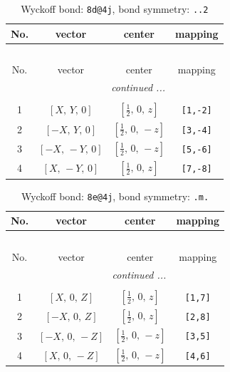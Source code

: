 \documentclass[fleqn,8pt]{jsarticle}
\begin{document}
\begin{longtable}{cccc}
\caption{Wyckoff bond: {\tt 8d@4j}, bond symmetry: {\tt ..2}}
 \\
 \hline \hline
No. & vector & center & mapping \\ \hline \endfirsthead

\multicolumn{3}{l}{\tablename\ \thetable{}} \\
 \hline \hline
No. & vector & center & mapping \\ \hline \endhead

 \hline \hline
\multicolumn{3}{r}{\footnotesize\it continued ...} \\ \endfoot

 \hline \hline
\multicolumn{3}{r}{} \\ \endlastfoot

1 & $\left[ X,\, Y,\, 0 \right]$ & $\left[ \frac{1}{2},\, 0,\, z \right]$ & {\tt [1,-2]} \\ \hline
2 & $\left[ - X,\, Y,\, 0 \right]$ & $\left[ \frac{1}{2},\, 0,\, - z \right]$ & {\tt [3,-4]} \\ \hline
3 & $\left[ - X,\, - Y,\, 0 \right]$ & $\left[ \frac{1}{2},\, 0,\, - z \right]$ & {\tt [5,-6]} \\ \hline
4 & $\left[ X,\, - Y,\, 0 \right]$ & $\left[ \frac{1}{2},\, 0,\, z \right]$ & {\tt [7,-8]} \\
\end{longtable}
\renewcommand{\arraystretch}{1.2}
\begin{longtable}{cccc}
\caption{Wyckoff bond: {\tt 8e@4j}, bond symmetry: {\tt .m.}}
 \\
 \hline \hline
No. & vector & center & mapping \\ \hline \endfirsthead

\multicolumn{3}{l}{\tablename\ \thetable{}} \\
 \hline \hline
No. & vector & center & mapping \\ \hline \endhead

 \hline \hline
\multicolumn{3}{r}{\footnotesize\it continued ...} \\ \endfoot

 \hline \hline
\multicolumn{3}{r}{} \\ \endlastfoot

1 & $\left[ X,\, 0,\, Z \right]$ & $\left[ \frac{1}{2},\, 0,\, z \right]$ & {\tt [1,7]} \\ \hline
2 & $\left[ - X,\, 0,\, Z \right]$ & $\left[ \frac{1}{2},\, 0,\, z \right]$ & {\tt [2,8]} \\ \hline
3 & $\left[ - X,\, 0,\, - Z \right]$ & $\left[ \frac{1}{2},\, 0,\, - z \right]$ & {\tt [3,5]} \\ \hline
4 & $\left[ X,\, 0,\, - Z \right]$ & $\left[ \frac{1}{2},\, 0,\, - z \right]$ & {\tt [4,6]} \\
\end{longtable}
\end{document}
